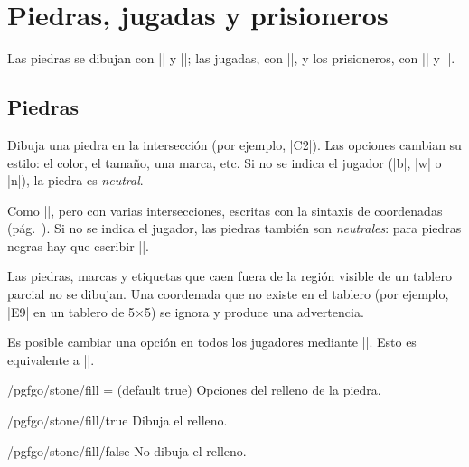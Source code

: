 \section{Piedras, jugadas y prisioneros}
\label{sec:piedras}

Las piedras se dibujan con |\stone| y |\stones|; las jugadas, con |\moves|, y los prisioneros, con |\prisoner| y |\prisoners|.

\subsection{Piedras}

\begin{command}{\stone{}}
	Dibuja una piedra en la intersección (por ejemplo, |C2|). Las opciones cambian su estilo: el color, el tamaño, una marca, etc. Si no se indica el jugador (|b|, |w| o |n|), la piedra es \emph{neutral}.
\end{command}


\begin{command}{\stones{}}
	Como |\stone|, pero con varias intersecciones, escritas con la sintaxis de coordenadas (pág.~\pageref{subsec:sintaxis-de-coordenadas}). Si no se indica el jugador, las piedras también son \emph{neutrales}: para piedras negras hay que escribir ||.
\end{command}

Las piedras, marcas y etiquetas que caen fuera de la región visible de un tablero parcial no se dibujan. Una coordenada que no existe en el tablero (por ejemplo, |E9| en un tablero de 5$\times$5) se ignora y produce una advertencia.

Es posible cambiar una opci\'on en todos los jugadores mediante ||. Esto es equivalente a ||.


\begin{key}{/pgfgo/stone/fill =  (default true)}
	Opciones del relleno de la piedra.
\end{key}

\begin{key}{/pgfgo/stone/fill/true}
	Dibuja el relleno.
\end{key}

\begin{key}{/pgfgo/stone/fill/false}
	No dibuja el relleno.

	\begin{codeexample}[]

		\begin{goban}
		\end{goban}

		\begin{goban}
			\stones[b]{C2,D3}
			\stone[w, fill = false]{B4}
		\end{goban}
	\end{codeexample}
\end{key}


